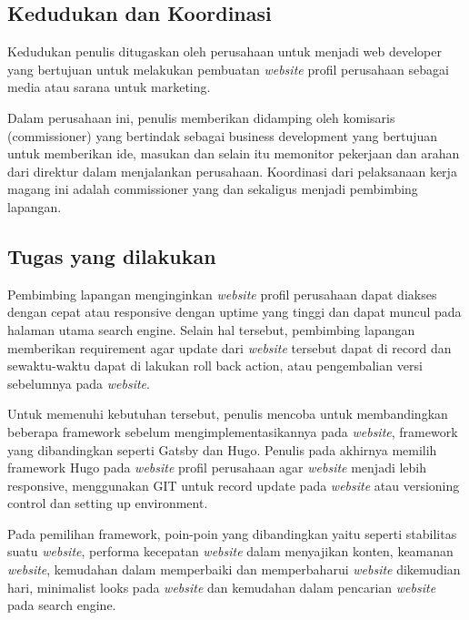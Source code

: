


\subsection{Kedudukan dan Koordinasi}

Kedudukan penulis ditugaskan oleh perusahaan untuk menjadi web developer yang bertujuan 
untuk melakukan pembuatan \emph{website} profil perusahaan sebagai media atau sarana untuk marketing.

Dalam perusahaan ini, penulis memberikan didamping oleh komisaris (commissioner) 
yang bertindak sebagai business development yang bertujuan untuk memberikan ide, 
masukan dan selain itu memonitor pekerjaan dan arahan dari direktur dalam menjalankan perusahaan. 
Koordinasi dari pelaksanaan kerja magang ini adalah commissioner yang dan 
sekaligus menjadi pembimbing lapangan.

\subsection{Tugas yang dilakukan} 

Pembimbing lapangan menginginkan \emph{website} profil perusahaan dapat diakses dengan cepat atau responsive dengan 
uptime yang tinggi dan dapat muncul pada halaman utama search engine. 
Selain hal tersebut, pembimbing lapangan memberikan requirement agar update 
dari \emph{website} tersebut dapat di record dan sewaktu-waktu dapat di lakukan roll back action, 
atau pengembalian versi sebelumnya pada \emph{website}.

Untuk memenuhi kebutuhan tersebut, penulis mencoba untuk membandingkan beberapa 
framework sebelum mengimplementasikannya pada \emph{website}, 
framework yang dibandingkan seperti Gatsby dan Hugo. 
Penulis pada akhirnya memilih framework Hugo pada \emph{website} profil perusahaan agar 
\emph{website} menjadi lebih responsive, menggunakan GIT untuk record update pada \emph{website} atau 
versioning control dan setting up environment.~\cite{progit} 

\pagebreak

Pada pemilihan framework, poin-poin yang dibandingkan yaitu seperti stabilitas suatu 
\emph{website}, performa kecepatan \emph{website} dalam menyajikan konten, keamanan \emph{website}, 
kemudahan dalam memperbaiki dan memperbaharui \emph{website} dikemudian hari, 
minimalist looks pada \emph{website} dan kemudahan dalam pencarian \emph{website} pada search engine.

